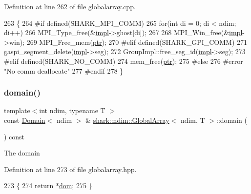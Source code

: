 Definition at line 262 of file globalarray.\+cpp.


\begin{DoxyCode}
263 \{
264 \textcolor{preprocessor}{#if defined(SHARK\_MPI\_COMM)}
265     \textcolor{keywordflow}{for}(\textcolor{keywordtype}{int} di = 0; di < ndim; di++)
266         MPI\_Type\_free(&\hyperlink{classshark_1_1ndim_1_1_global_array_a70684121da4badfef791c15d7076282f}{impl}->ghost[di]);
267 
268     MPI\_Win\_free(&\hyperlink{classshark_1_1ndim_1_1_global_array_a70684121da4badfef791c15d7076282f}{impl}->win);
269     MPI\_Free\_mem(\hyperlink{classshark_1_1ndim_1_1_global_array_ad4af3b8307a3a7107186cf699b5a2432}{ptr});
270 \textcolor{preprocessor}{#elif defined(SHARK\_GPI\_COMM)}
271     gaspi\_segment\_delete(\hyperlink{classshark_1_1ndim_1_1_global_array_a70684121da4badfef791c15d7076282f}{impl}->seg);
272         GroupImpl::free\_seg\_id(\hyperlink{classshark_1_1ndim_1_1_global_array_a70684121da4badfef791c15d7076282f}{impl}->seg);
273 \textcolor{preprocessor}{#elif defined(SHARK\_NO\_COMM)}
274     mem\_free(\hyperlink{classshark_1_1ndim_1_1_global_array_ad4af3b8307a3a7107186cf699b5a2432}{ptr});
275 \textcolor{preprocessor}{#else}
276 \textcolor{preprocessor}{#error "No comm deallocate"}
277 \textcolor{preprocessor}{#endif}
278 \}
\end{DoxyCode}
\hypertarget{classshark_1_1ndim_1_1_global_array_a435ee8ff23c3feadf2ef2be64d4f375c}{}\label{classshark_1_1ndim_1_1_global_array_a435ee8ff23c3feadf2ef2be64d4f375c} 
\subsubsection{\texorpdfstring{domain()}{domain()}}
{\footnotesize\ttfamily template$<$int ndim, typename T $>$ \\
const \hyperlink{classshark_1_1ndim_1_1_domain}{Domain}$<$ ndim $>$ \& \hyperlink{classshark_1_1ndim_1_1_global_array}{shark\+::ndim\+::\+Global\+Array}$<$ ndim, T $>$\+::domain (\begin{DoxyParamCaption}{ }\end{DoxyParamCaption}) const\hspace{0.3cm}{\ttfamily [inline]}}

The domain 

Definition at line 273 of file globalarray.\+hpp.


\begin{DoxyCode}
273                                                                      \{
274             \textcolor{keywordflow}{return} *\hyperlink{classshark_1_1ndim_1_1_global_array_a412e192f4c7a15888da625ae833e8d3e}{dom};
275         \}
\end{DoxyCode}
\hypertarget{classshark_1_1ndim_1_1_global_array_a2afde2694e3e5a09dc1f782b5f0f3b82}{}\label{classshark_1_1ndim_1_1_global_array_a2afde2694e3e5a09dc1f782b5f0f3b82} 
